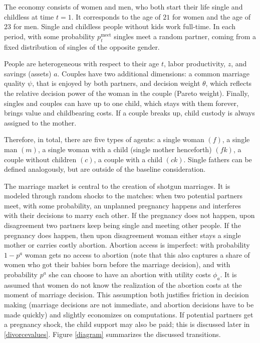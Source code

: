 \documentclass[12pt,letter]{article}
\begin{document}
The economy consists of women and men, who both start their life single and childless at time $t = 1$. It corresponds to the age of $21$ for women and the age of $23$ for men. Single and childless people without kids work full-time. In each period, with some probability $p^{\text{meet}}_t$ singles meet a random partner, coming from a fixed distribution of singles of the opposite gender. 

People are heterogeneous with respect to their age $t$, labor productivity, $z$, and savings (assets) $a$. Couples have two additional dimensions: a common marriage quality $\psi$, that is enjoyed by both partners, and decision weight $\theta$, which reflects the relative decision power of the woman in the couple (Pareto weight). Finally, singles and couples can have up to one child, which stays with them forever, brings value and childbearing costs. If a couple breaks up, child custody is always assigned to the mother.

Therefore, in total, there are five types of agents: a single woman $(f)$, a single man $(m)$, a single woman with a child (single mother henceforth) $(fk)$, a couple without children $(c)$, a couple with a child $(ck)$. Single fathers can be defined analogously, but are outside of the baseline consideration. 

The marriage market is central to the creation of shotgun marriages. It is modeled through random shocks to the matches: when two potential partners meet, with some probability, an unplanned pregnancy happens and interferes with their decisions to marry each other. If the pregnancy does not happen, upon disagreement two partners keep being single and meeting other people. If the pregnancy does happen, then upon disagreement woman either stays a single mother or carries costly abortion. Abortion access is imperfect: with probability $1-p^a$ woman gets no access to abortion (note that this also captures a share of women who got their babies born before the marriage decision), and with probability $p^a$ she can choose to have an abortion with utility costs $\phi_a$. It is assumed that women do not know the realization of the abortion costs at the moment of marriage decision. This assumption both justifies friction in decision making (marriage decisions are not immediate, and abortion decisions have to be made quickly) and slightly economizes on computations. If potential partners get a pregnancy shock, the child support may also be paid; this is discussed later in \ref{divorcevalues}. Figure \ref{diagram} summarizes the discussed transitions.
\end{document}
